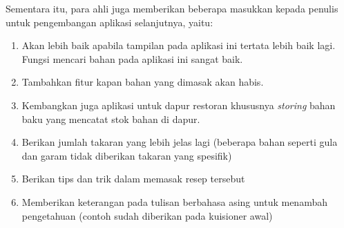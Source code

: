 		Sementara itu, para ahli juga memberikan beberapa masukkan kepada penulis untuk pengembangan aplikasi selanjutnya, yaitu:
		\begin{enumerate}
			\item Akan lebih baik apabila tampilan pada aplikasi ini tertata lebih baik lagi. Fungsi mencari bahan pada aplikasi ini sangat baik.
			\item Tambahkan fitur kapan bahan yang dimasak akan habis. 
			\item Kembangkan juga aplikasi untuk dapur restoran khususnya \textit{storing} bahan baku yang mencatat stok bahan di dapur.
			\item Berikan jumlah takaran yang lebih jelas lagi (beberapa bahan seperti gula dan garam tidak diberikan takaran yang spesifik)
			\item Berikan tips dan trik dalam memasak resep tersebut
			\item Memberikan keterangan pada tulisan berbahasa asing untuk menambah pengetahuan (contoh sudah diberikan pada kuisioner awal) 
		\end{enumerate} 
		

